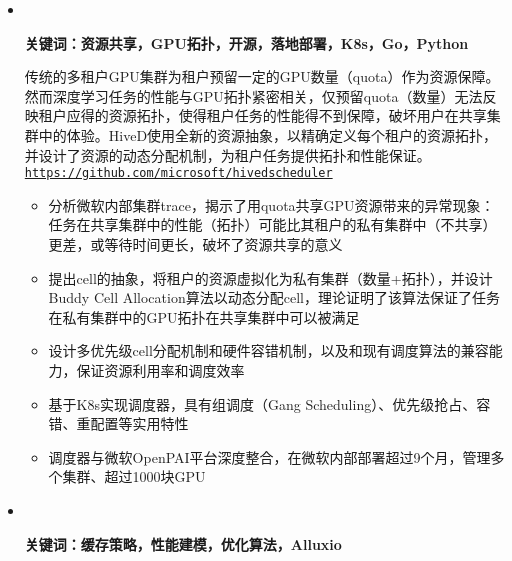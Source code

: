   \begin{itemize}[leftmargin=*]
    \item
      \vspace{-10pt}\\
      {\small
          \textbf{关键词：资源共享，GPU拓扑，开源，落地部署，K8s，Go，Python}

          传统的多租户GPU集群为租户预留一定的GPU数量（quota）作为资源保障。然而深度学习任务的性能与GPU拓扑紧密相关，仅预留quota（数量）无法反映租户应得的资源拓扑，使得租户任务的性能得不到保障，破坏用户在共享集群中的体验。HiveD使用全新的资源抽象，以精确定义每个租户的资源拓扑，并设计了资源的动态分配机制，为租户任务提供拓扑和性能保证。\texttt{\url{https://github.com/microsoft/hivedscheduler}}
          \vspace{-5pt}
          \begin{itemize}[leftmargin=*]
            \item 分析微软内部集群trace，揭示了用quota共享GPU资源带来的异常现象：任务在共享集群中的性能（拓扑）可能比其租户的私有集群中（不共享）更差，或等待时间更长，破坏了资源共享的意义
            \item 提出cell的抽象，将租户的资源虚拟化为私有集群（数量+拓扑），并设计Buddy Cell Allocation算法以动态分配cell，理论证明了该算法保证了任务在私有集群中的GPU拓扑在共享集群中可以被满足
            \item 设计多优先级cell分配机制和硬件容错机制，以及和现有调度算法的兼容能力，保证资源利用率和调度效率
            \item 基于K8s实现调度器，具有组调度（Gang Scheduling）、优先级抢占、容错、重配置等实用特性
            \item 调度器与微软OpenPAI平台深度整合，在微软内部部署超过9个月，管理多个集群、超过1000块GPU
          \end{itemize}
      }
    \item
      \vspace{-10pt}\\
      {\small
          \textbf{关键词：缓存策略，性能建模，优化算法，Alluxio}

}
\end{itemize}
